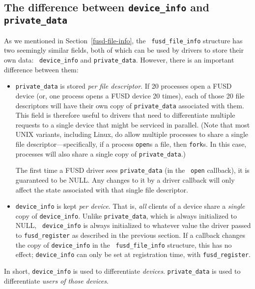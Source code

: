 \documentclass{article}
\begin{document}
\subsection{The difference between {\tt device\_info} and {\tt
private\_data}}

\label{private-data}

As we mentioned in Section~\ref{fusd-file-info}, the {\tt
fusd\_file\_info} structure has two seemingly similar fields, both of
which can be used by drivers to store their own data: {\tt
device\_info} and {\tt private\_data}.  However, there is an important
difference between them:

\begin{itemize}

\item {\tt private\_data} is stored {\em per file descriptor}.  If 20
processes open a FUSD device (or, one process opens a FUSD device 20
times), each of those 20 file descriptors will have their own copy of
{\tt private\_data} associated with them.  This field is therefore
useful to drivers that need to differentiate multiple requests to a
single device that might be serviced in parallel.  (Note that most
UNIX variants, including Linux, do allow multiple processes to share a
single file descriptor---specifically, if a process {\tt open}s a
file, then {\tt fork}s.  In this case, processes will also share a
single copy of {\tt private\_data}.)

The first time a FUSD driver sees {\tt private\_data} (in the {\tt
open} callback), it is guaranteed to be NULL.  Any changes to it by a
driver callback will only affect the state associated with that single
file descriptor.

\item {\tt device\_info} is kept {\em per device}.  That is, {\em all}
clients of a device share a {\em single} copy of {\tt device\_info}.
Unlike {\tt private\_data}, which is always initialized to NULL, {\tt
device\_info} is always initialized to whatever value the driver
passed to {\tt fusd\_register} as described in the previous section.
If a callback changes the copy of {\tt device\_info} in the {\tt
fusd\_file\_info} structure, this has no effect; {\tt device\_info}
can only be set at registration time, with {\tt fusd\_register}.

\end{itemize}

In short, {\tt device\_info} is used to differentiate {\em devices}.
{\tt private\_data} is used to differentiate {\em users of those
devices}.
\end{document}
